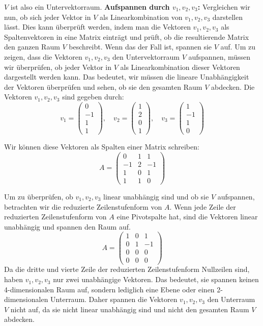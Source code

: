 \documentclass[a4paper]{scrartcl}
\newcounter{spalte}
\newcounter{zeile}
\begin{document}
$V$ ist also ein Untervektorraum.
\textbf{Aufspannen durch $v_1, v_2, v_3$:}
Vergleichen wir nun, ob sich jeder Vektor in $V$ als Linearkombination von $v_1, v_2, v_3$ darstellen lässt. Dies kann überprüft werden, indem man die Vektoren $v_1, v_2, v_3$ als Spaltenvektoren in eine Matrix einträgt und prüft, ob die resultierende Matrix den ganzen Raum $V$ beschreibt. Wenn das der Fall ist, spannen sie $V$ auf.
Um zu zeigen, dass die Vektoren $v_1, v_2, v_3$ den Untervektorraum $V$ aufspannen, müssen wir überprüfen, ob jeder Vektor in $V$ als Linearkombination dieser Vektoren dargestellt werden kann. Das bedeutet, wir müssen die lineare Unabhängigkeit der Vektoren überprüfen und sehen, ob sie den gesamten Raum $V$ abdecken.
Die Vektoren $v_1, v_2, v_3$ sind gegeben durch:
\[ v_1 = \begin{pmatrix} 0 \\ -1 \\ 1 \\ 1 \end{pmatrix}, \quad v_2 = \begin{pmatrix} 1 \\ 2 \\ 0 \\ 1 \end{pmatrix}, \quad v_3 = \begin{pmatrix} 1 \\ -1 \\ 1 \\ 0 \end{pmatrix} \]

Wir können diese Vektoren als Spalten einer Matrix schreiben:
\[ A = \begin{pmatrix} 0 & 1 & 1 \\ -1 & 2 & -1 \\ 1 & 0 & 1 \\ 1 & 1 & 0 \end{pmatrix} \]

Um zu überprüfen, ob $v_1, v_2, v_3$ linear unabhängig sind und ob sie $V$ aufspannen, betrachten wir die reduzierte Zeilenstufenform von $A$. Wenn jede Zeile der reduzierten Zeilenstufenform von $A$ eine Pivotspalte hat, sind die Vektoren linear unabhängig und spannen den Raum auf.
\[ A = \begin{pmatrix} 1 & 0 & 1 \\ 0 & 1 & -1 \\ 0 & 0 & 0 \\ 0 & 0 & 0 \end{pmatrix} \]
Da die dritte und vierte Zeile der reduzierten Zeilenstufenform Nullzeilen sind, haben $v_1, v_2, v_3$ nur zwei unabhängige Vektoren. Das bedeutet, sie spannen keinen 4-dimensionalen Raum auf, sondern lediglich eine Ebene oder einen 2-dimensionalen Unterraum.
Daher spannen die Vektoren $v_1, v_2, v_3$ den Unterraum $V$ nicht auf, da sie nicht linear unabhängig sind und nicht den gesamten Raum $V$ abdecken.
\end{document}
